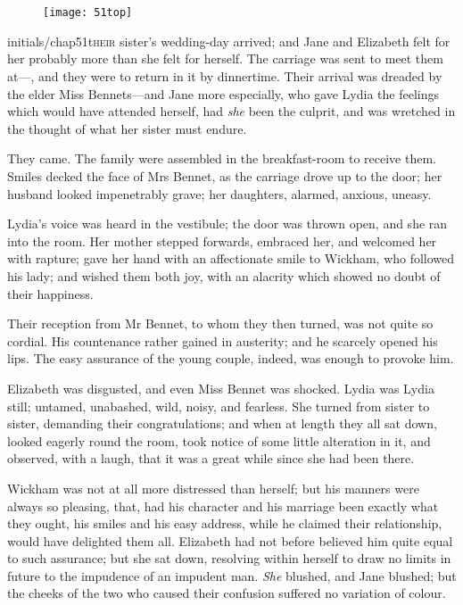 \chapter[Chapter \thechapter]{}
	
\begin{figure}[t!]
\centering
\texttt{[image: 51top]}
\end{figure}


\lettrine[lines=6,image=true]{initials/chap51t}{heir}  sister's wedding-day arrived; and Jane and Elizabeth felt for her probably more than she felt for herself. The carriage was sent to meet them at—, and they were to return in it by dinnertime. Their arrival was dreaded by the elder Miss Bennets—and Jane more especially, who gave Lydia the feelings which would have attended herself, had \textit{she} been the culprit, and was wretched in the thought of what her sister must endure.

They came. The family were assembled in the breakfast-room to receive them. Smiles decked the face of Mrs Bennet, as the carriage drove up to the door; her husband looked impenetrably grave; her daughters, alarmed, anxious, uneasy.

Lydia's voice was heard in the vestibule; the door was thrown open, and she ran into the room. Her mother stepped forwards, embraced her, and welcomed her with rapture; gave her hand with an affectionate smile to Wickham, who followed his lady; and wished them both joy, with an alacrity which showed no doubt of their happiness.

Their reception from Mr Bennet, to whom they then turned, was not quite so cordial. His countenance rather gained in austerity; and he scarcely opened his lips. The easy assurance of the young couple, indeed, was enough to provoke him.

Elizabeth was disgusted, and even Miss Bennet was shocked. Lydia was Lydia still; untamed, unabashed, wild, noisy, and fearless. She turned from sister to sister, demanding their congratulations; and when at length they all sat down, looked eagerly round the room, took notice of some little alteration in it, and observed, with a laugh, that it was a great while since she had been there.

Wickham was not at all more distressed than herself; but his manners were always so pleasing, that, had his character and his marriage been exactly what they ought, his smiles and his easy address, while he claimed their relationship, would have delighted them all. Elizabeth had not before believed him quite equal to such assurance; but she sat down, resolving within herself to draw no limits in future to the impudence of an impudent man. \textit{She} blushed, and Jane blushed; but the cheeks of the two who caused their confusion suffered no variation of colour.

